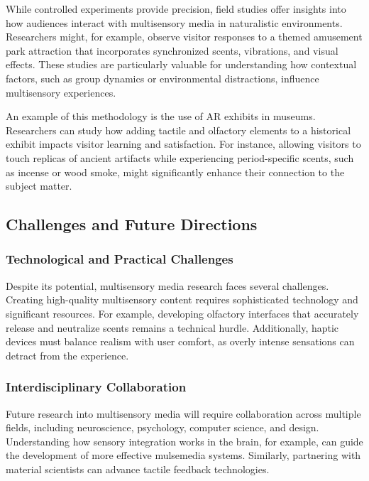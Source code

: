 \documentclass[
]{book}
\begin{document}
While controlled experiments provide precision, field studies offer insights into how audiences interact with multisensory media in naturalistic environments. Researchers might, for example, observe visitor responses to a themed amusement park attraction that incorporates synchronized scents, vibrations, and visual effects. These studies are particularly valuable for understanding how contextual factors, such as group dynamics or environmental distractions, influence multisensory experiences.

An example of this methodology is the use of AR exhibits in museums. Researchers can study how adding tactile and olfactory elements to a historical exhibit impacts visitor learning and satisfaction. For instance, allowing visitors to touch replicas of ancient artifacts while experiencing period-specific scents, such as incense or wood smoke, might significantly enhance their connection to the subject matter.

\subsection*{Challenges and Future Directions}\label{challenges-and-future-directions}

\subsubsection*{Technological and Practical Challenges}\label{technological-and-practical-challenges}

Despite its potential, multisensory media research faces several challenges. Creating high-quality multisensory content requires sophisticated technology and significant resources. For example, developing olfactory interfaces that accurately release and neutralize scents remains a technical hurdle. Additionally, haptic devices must balance realism with user comfort, as overly intense sensations can detract from the experience.

\subsubsection*{Interdisciplinary Collaboration}\label{interdisciplinary-collaboration}

Future research into multisensory media will require collaboration across multiple fields, including neuroscience, psychology, computer science, and design. Understanding how sensory integration works in the brain, for example, can guide the development of more effective mulsemedia systems. Similarly, partnering with material scientists can advance tactile feedback technologies.
\end{document}
